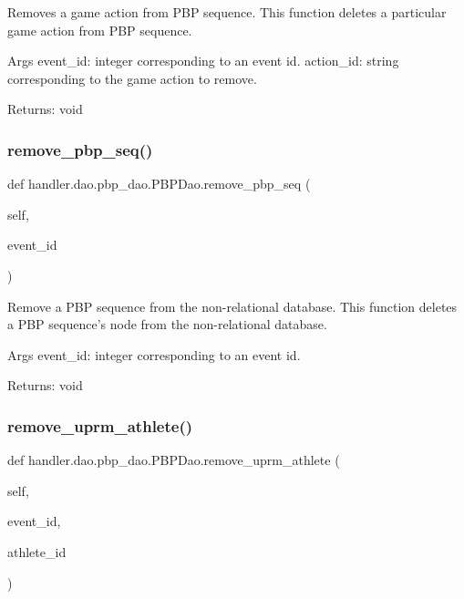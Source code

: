 \begin{DoxyVerb}Removes a game action from PBP sequence.
This function deletes a particular game action from PBP sequence.

Args
    event_id: integer corresponding to an event id.
    action_id: string corresponding to the game action to remove.

Returns:
    void
\end{DoxyVerb}
 \mbox{\label{classhandler_1_1dao_1_1pbp__dao_1_1_p_b_p_dao_a6c920f35c66c135f03d4bc973396d1a1}} 
\subsubsection{\texorpdfstring{remove\+\_\+pbp\+\_\+seq()}{remove\_pbp\_seq()}}
{\footnotesize\ttfamily def handler.\+dao.\+pbp\+\_\+dao.\+P\+B\+P\+Dao.\+remove\+\_\+pbp\+\_\+seq (\begin{DoxyParamCaption}\item[{}]{self,  }\item[{}]{event\+\_\+id }\end{DoxyParamCaption})}

\begin{DoxyVerb}Remove a PBP sequence from the non-relational database.
This function deletes a PBP sequence's node from the non-relational database.

Args
    event_id: integer corresponding to an event id.

Returns:
    void
\end{DoxyVerb}
 \mbox{\label{classhandler_1_1dao_1_1pbp__dao_1_1_p_b_p_dao_a8f5c7ee21ed3fb4536bf421c000248c8}} 
\subsubsection{\texorpdfstring{remove\+\_\+uprm\+\_\+athlete()}{remove\_uprm\_athlete()}}
{\footnotesize\ttfamily def handler.\+dao.\+pbp\+\_\+dao.\+P\+B\+P\+Dao.\+remove\+\_\+uprm\+\_\+athlete (\begin{DoxyParamCaption}\item[{}]{self,  }\item[{}]{event\+\_\+id,  }\item[{}]{athlete\+\_\+id }\end{DoxyParamCaption})}

